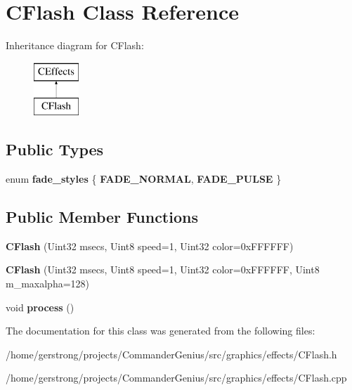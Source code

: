 \hypertarget{class_c_flash}{
\section{CFlash Class Reference}
\label{class_c_flash}
}
Inheritance diagram for CFlash:\begin{figure}[H]
\begin{center}
\leavevmode
\includegraphics[height=2cm]{class_c_flash}
\end{center}
\end{figure}
\subsection*{Public Types}
\begin{DoxyCompactItemize}
\item 
enum {\bfseries fade\_\-styles} \{ {\bfseries FADE\_\-NORMAL}, 
{\bfseries FADE\_\-PULSE}
 \}
\end{DoxyCompactItemize}
\subsection*{Public Member Functions}
\begin{DoxyCompactItemize}
\item 
\hypertarget{class_c_flash_a190ddcdf73a06208f08ec0b64b93a291}{
{\bfseries CFlash} (Uint32 msecs, Uint8 speed=1, Uint32 color=0xFFFFFF)}
\label{class_c_flash_a190ddcdf73a06208f08ec0b64b93a291}

\item 
\hypertarget{class_c_flash_ae103ba4c2dda25db911fa6338ccb6ba4}{
{\bfseries CFlash} (Uint32 msecs, Uint8 speed=1, Uint32 color=0xFFFFFF, Uint8 m\_\-maxalpha=128)}
\label{class_c_flash_ae103ba4c2dda25db911fa6338ccb6ba4}

\item 
\hypertarget{class_c_flash_ae9d7a7bdd3b9426c58ab9fa196b150bb}{
void {\bfseries process} ()}
\label{class_c_flash_ae9d7a7bdd3b9426c58ab9fa196b150bb}

\end{DoxyCompactItemize}


The documentation for this class was generated from the following files:\begin{DoxyCompactItemize}
\item 
/home/gerstrong/projects/CommanderGenius/src/graphics/effects/CFlash.h\item 
/home/gerstrong/projects/CommanderGenius/src/graphics/effects/CFlash.cpp\end{DoxyCompactItemize}
